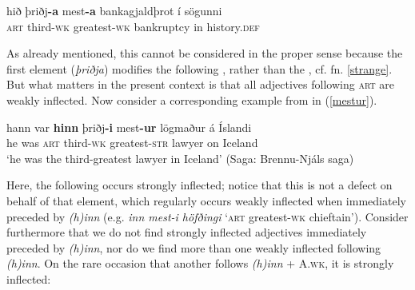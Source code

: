 \documentclass[output=paper,colorlinks,citecolor=brown]{langscibook}
\begin{document}
\begin{exe}
      \ex \label{free2crep}
      \gll hið þriðj\textbf{-a} mest\textbf{-a} bankagjaldþrot {í sögunni}  \\ 
      \textsc{art} third-\textsc{wk} greatest-\textsc{wk} bankruptcy {in history.\textsc{def} }  \\  
\end{exe} 


As already mentioned, this cannot be considered  in the proper sense because the first element (\textit{þriðja}) modifies the following , rather than the , cf. fn. \ref{strange}. But what matters in the present context is that all adjectives following \textsc{art} are weakly inflected. Now consider a corresponding example from  in (\ref{mestur}).

\begin{exe}
\ex \label{mestur}   
       \gll  hann var \textbf{hinn} þriðj\textbf{-i} mest\textbf{-ur} lögmaður {á Íslandi} \\ 
         he was \textsc{art} third-\textsc{wk} greatest-\textsc{str} lawyer {on Iceland} \\ 
         \glt `he was the third-greatest lawyer in Iceland' (Saga: Brennu-Njáls saga)
\end{exe} 

Here, the following   occurs strongly inflected; notice that this is not a defect on behalf of that element, which regularly occurs weakly inflected when immediately preceded by \textit{(h)inn} (e.g. \textit{inn mest-i höfðingi} `\textsc{art} greatest-\textsc{wk} chieftain'). Consider furthermore that we do not find strongly inflected adjectives immediately preceded by \textit{(h)inn}, nor do we find more than one weakly inflected  following \textit{(h)inn}. On the rare occasion that another  follows \textit{(h)inn} + A.\textsc{wk}, it is strongly inflected: 
\end{document}
